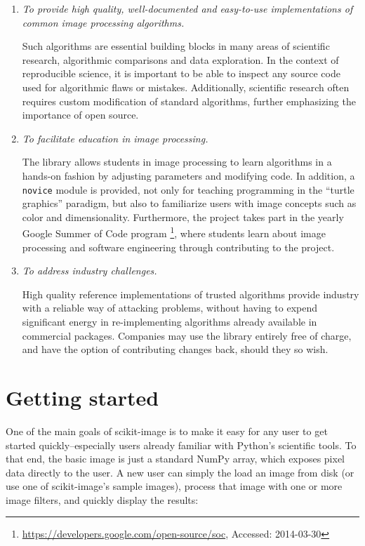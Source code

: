 \documentclass[fleqn,12pt]{wlpeerj}
\begin{document}
\begin{enumerate}
    \item  %
        \textit{To provide high quality, well-documented and easy-to-use implementations of common image processing algorithms.}

        Such algorithms are essential building blocks in many areas of scientific research, algorithmic comparisons and data exploration. In the context of reproducible science, it is important to be able to inspect any source code used for algorithmic flaws or mistakes. Additionally, scientific research often requires custom modification of standard algorithms, further emphasizing the importance of open source.

    \item  %
        \textit{To facilitate education in image processing.}

        The library allows students in image processing to learn algorithms in a hands-on fashion by adjusting parameters and modifying code. In addition, a \texttt{novice} module is provided, not only for teaching programming in the ``turtle graphics'' paradigm, but also to familiarize users with image concepts such as color and dimensionality. Furthermore, the project takes part in the yearly Google Summer of Code program \footnote{\url{https://developers.google.com/open-source/soc}, Accessed: 2014-03-30}, where students learn about image processing and software engineering through contributing to the project.

    \item  %
        \textit{To address industry challenges.}

        High quality reference implementations of trusted algorithms provide industry with a reliable way of attacking problems, without having to expend significant energy in re-implementing algorithms already available in commercial packages.  Companies may use the library entirely free of charge, and have the option of contributing changes back, should they so wish.
\end{enumerate}



\section*{Getting started}
\label{sec:getting-started}

One of the main goals of scikit-image is to make it easy for any user to get started quickly--especially users already familiar with Python's scientific tools. To that end, the basic image is just a standard NumPy array, which exposes pixel data directly to the user. A new user can simply the load an image from disk (or use one of scikit-image's sample images), process that image with one or more image filters, and quickly display the results:
\end{document}
